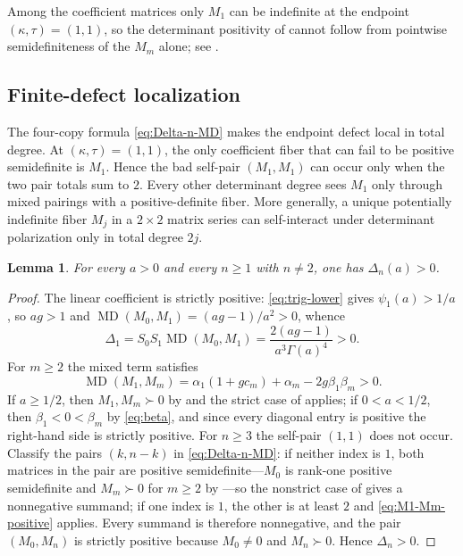 \documentclass[11pt,a4paper]{amsart}
\numberwithin{equation}{section}
\theoremstyle{plain}
\newtheorem{lemma}[theorem]{Lemma}
\theoremstyle{definition}
\newcommand{\MD}{\operatorname{MD}}
\begin{document}
Among the coefficient matrices only \(M_1\) can be indefinite at the endpoint
\((\kappa,\tau)=(1,1)\), so the determinant positivity of  cannot
follow from pointwise semidefiniteness of the \(M_m\) alone; see
.



\subsection{Finite-defect localization}\label{subsec:finite-defect}

The four-copy formula \eqref{eq:Delta-n-MD} makes the endpoint defect local in
total degree.  At \((\kappa,\tau)=(1,1)\), the only coefficient fiber that can
fail to be positive semidefinite is \(M_1\).  Hence the bad self-pair
\((M_1,M_1)\) can occur only when the two pair totals sum to \(2\).  Every
other determinant degree sees \(M_1\) only through mixed pairings with a
positive-definite fiber.  More generally, a unique potentially indefinite
fiber \(M_j\) in a \(2\times2\) matrix series can self-interact under
determinant polarization only in total degree \(2j\).

\begin{lemma}\label{lem:Delta-n-noneq2}
For every \(a>0\) and every \(n\ge1\) with \(n\ne2\), one has \(\Delta_n(a)>0\).
\end{lemma}

\begin{proof}
The linear coefficient is strictly positive: \eqref{eq:trig-lower} gives
\(\psi_1(a)>1/a\), so \(ag>1\) and \(\MD(M_0,M_1)=(ag-1)/a^2>0\),
whence
\begin{equation}\label{eq:Delta1-sharp}
 \Delta_1=S_0S_1\MD(M_0,M_1)
 =\frac{2(ag-1)}{a^3\Gamma(a)^4}>0.
\end{equation}
For \(m\ge2\) the mixed term satisfies
\begin{equation}\label{eq:M1-Mm-positive}
 \MD(M_1,M_m)
 =\alpha_1(1+gc_m)+\alpha_m-2g\beta_1\beta_m>0.
\end{equation}
If \(a\ge1/2\), then \(M_1,M_m\succ0\) by  and the strict case of
 applies; if \(0<a<1/2\), then \(\beta_1<0<\beta_m\) by
\eqref{eq:beta}, and since every diagonal entry is positive the right-hand side
is strictly positive.
For \(n\ge3\) the self-pair \((1,1)\) does not occur.  Classify the pairs \((k,n-k)\)
in \eqref{eq:Delta-n-MD}: if neither index is \(1\), both matrices in the pair are
positive semidefinite---\(M_0\) is rank-one positive semidefinite and \(M_m\succ0\)
for \(m\ge2\) by ---so the nonstrict case of 
gives a nonnegative summand; if one index is \(1\), the other is at least \(2\) and
\eqref{eq:M1-Mm-positive} applies.  Every summand is therefore nonnegative, and
the pair \((M_0,M_n)\) is strictly positive because \(M_0\ne0\) and \(M_n\succ0\).
Hence \(\Delta_n>0\).
\end{proof}
\end{document}
